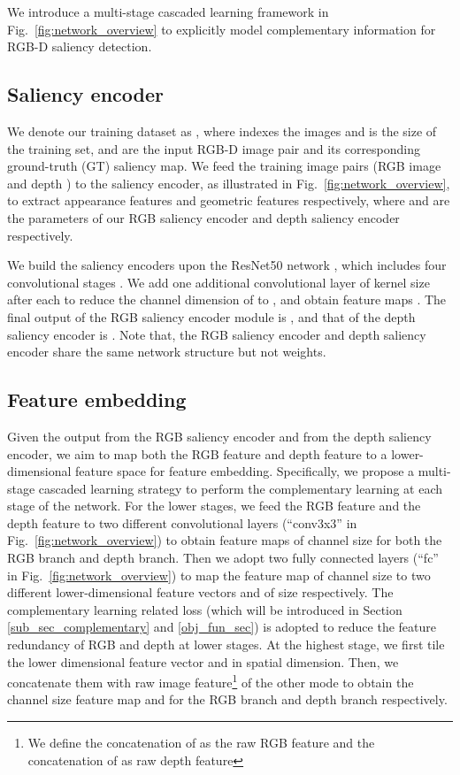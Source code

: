 \documentclass[10pt,twocolumn,letterpaper]{article}
\begin{document}
We introduce a multi-stage cascaded learning
framework in Fig.~\ref{fig:network_overview} to explicitly model 
complementary information for RGB-D saliency detection.


\subsection{Saliency encoder}
We denote our training dataset as , where  indexes the images and  is the size of the training set,  and  are the input RGB-D image pair and its
corresponding ground-truth (GT) saliency map.
We feed the training image pairs (RGB image  and
depth ) to the saliency encoder,
as illustrated in Fig.~\ref{fig:network_overview}, to extract appearance features  and geometric features  respectively, where  and  are the parameters of our RGB saliency encoder and depth saliency encoder respectively.

We build the saliency encoders upon the ResNet50 network \cite{ResHe2015}, which includes four convolutional stages . We add one additional convolutional layer of kernel size  after each  to reduce the channel dimension of  to , and obtain feature maps .
The final output of the RGB saliency encoder module is , and that of the depth saliency encoder is . Note that, the RGB saliency encoder and depth saliency encoder share the same network structure but not weights.









\subsection{Feature embedding}
\label{latent_feature_sec}


Given the output  from the RGB saliency encoder and  from the depth saliency encoder, we aim to map both the RGB feature and depth feature to a lower-dimensional feature space for feature embedding.
Specifically, we propose a multi-stage cascaded learning strategy to perform the complementary learning at each stage of the network. For the lower stages, we feed the RGB feature  and the depth feature  to two different  convolutional layers (\enquote{conv3x3} in Fig.~\ref{fig:network_overview}) to obtain feature maps of channel size  for both the RGB branch and depth branch. Then we adopt two fully connected layers (\enquote{fc} in Fig.~\ref{fig:network_overview}) to map the feature map of channel size  to two different lower-dimensional feature vectors  and  of size  respectively. The complementary learning related loss (which will be introduced in Section \ref{sub_sec_complementary} and \ref{obj_fun_sec}) is adopted to reduce the feature redundancy of RGB and depth at lower stages. 
At the highest stage, we first tile the lower dimensional feature vector  and  in spatial dimension. Then, we concatenate them with raw image feature\footnote{We define the concatenation of  as the raw RGB feature and the concatenation of  as raw depth feature} of the other mode
to obtain the  channel size feature map  and  for the RGB branch and depth branch respectively.
\end{document}
